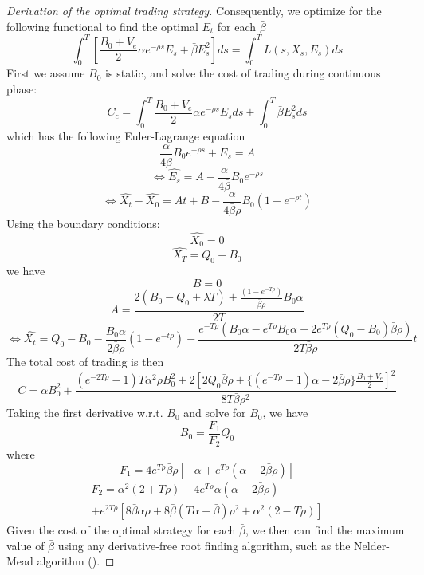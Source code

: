 \documentclass{article}
\begin{document}
\begin{proof}[Derivation of the optimal trading strategy]
  Consequently, we optimize for the following functional to find the optimal $E_t$ for each $\bar{\beta}$
  \[
    \int_0^T [ \frac{B_0 + V_e}{2} \alpha e^{-\rho s} E_s +  \bar{\beta} E_s^2 ] ds=\int_0^T L(s, X_s, E_s) ds
  \]
  First we assume $B_0$ is static, and solve the cost of trading during continuous phase:
  \[
    C_c = \int_0^T \frac{B_0 + V_e}{2} \alpha e^{-\rho s} E_s ds + \int_0^T  \bar{\beta} E_s^2 ds
  \]
  which has the following Euler-Lagrange equation
  \[
    \frac{\alpha}{4 \bar{\beta}} B_0  e^{-\rho s} +E_s = A
  \]
  \[
    \Leftrightarrow \hat{E_s} = A - \frac{\alpha}{4 \bar{\beta}} B_0 e^{-\rho s}
  \]
  \[
    \Leftrightarrow \hat{X_t} - \hat{X_0} = At + B - \frac{\alpha}{4 \bar{\beta} \rho}B_ 0 (1 - e^{-\rho t})
  \]
  Using the boundary conditions:
  \[
    \hat{X_0} = 0
  \]
  \[
    \hat{X_T} = Q_0 - B_0
  \]
  we have
  \[
    B = 0
  \]
  \[
    A = \frac{2 (B_0 - Q_0 + \lambda T) + \frac{(1 - e^{-T \rho})}{\bar{\beta} \rho} B_0 \alpha} {2 T}
  \]
  \[
    \Leftrightarrow \hat{X_t} = Q_0 - B_0  - \frac{B_0 \alpha}{2 \bar{\beta} \rho}(1 - e^{-t \rho}) - \frac{e^{-T \rho} (B_0 \alpha - e^{T \rho}B_0 \alpha + 2 e^{T \rho} (Q_0 - B_0) \bar{\beta} \rho )}{2 T \bar{\beta} \rho} t
  \]
  The total cost of trading is then
  \[
    C = \alpha B_0^2 + \frac{(e^{-2 T \rho} - 1) T \alpha^2 \rho B_0^2 + 2 [2 Q_0 \bar{\beta} \rho + \{(e^{-T \rho} - 1) \alpha - 2 \bar{\beta} \rho\} \frac{B_0 + V_e}{2}]^2}{8 T \bar{\beta} \rho^2}
  \]
  Taking the first derivative w.r.t. $B_0$ and solve for $B_0$, we have
  \[
    B_0 = \frac{F_1}{F_2} Q_0
  \]
  where
  \[
    F_1 = 4 e^{T \rho} \bar{\beta} \rho [-\alpha + e^{T \rho} (\alpha + 2 \bar{\beta} \rho)]
  \]
  \[
    \begin{split}
      F_2 = \alpha^2 (2 + T \rho) - 4 e^{T \rho} \alpha (\alpha + 2 \bar{\beta} \rho)\ \\
      + e^{2 T \rho} [8 \bar{\beta} \alpha \rho + 8 \bar{\beta} (T \alpha + \bar{\beta}) \rho^2 + \alpha^2 (2 - T \rho)]
    \end{split}
  \]
  Given the cost of the optimal strategy for each  $\bar{\beta}$, we then can find the maximum value of $\bar{\beta}$ using any derivative-free root finding algorithm, such as the Nelder-Mead algorithm (\cite{NelderMead1965}).

\end{proof}



\end{document}
